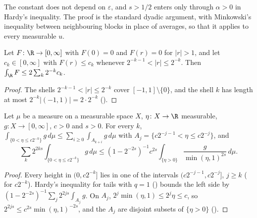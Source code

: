 The constant does not depend on $\varepsilon$, and $s > 1/2$ enters only through $\alpha > 0$ in
Hardy's inequality. The proof is the standard dyadic argument, with Minkowski's inequality
between neighbouring blocks in place of averages, so that it applies to every measurable $u$.

\begin{lemma}
\label{lem:dyadic-shells-line}
\leanok
{}
Let $F \colon \R \to [0, \infty]$ with $F(0) = 0$ and $F(r) = 0$ for $|r| > 1$, and let
$c_k \in [0, \infty]$ with $F(r) \leq c_k$ whenever $2^{-k-1} < |r| \leq 2^{-k}$. Then
$\int_\R F \leq 2 \sum_k 2^{-k} c_k$.
\end{lemma}

\begin{proof}
\leanok
The shells $2^{-k-1} < |r| \leq 2^{-k}$ cover $[-1, 1] \setminus \{0\}$, and the shell $k$ has
length at most $2^{-k} |(-1, 1)| = 2 \cdot 2^{-k}$ ().
\end{proof}

\begin{lemma}
\label{lem:height-layers}
\leanok
{}
Let $\mu$ be a measure on a measurable space $X$, $\eta \colon X \to \R$ measurable,
$g \colon X \to [0, \infty]$, $c > 0$ and $s > 0$. For every $k$,
$\int_{\{0 < \eta \leq c 2^{-k}\}} g \, d\mu \leq \sum_{i \geq 0} \int_{A_{k+i}} g \, d\mu$ with
$A_j = \{c 2^{-j-1} < \eta \leq c 2^{-j}\}$, and
\[
  \sum_k 2^{2ks} \int_{\{0 < \eta \leq c 2^{-k}\}} g \, d\mu
  \leq (1 - 2^{-2s})^{-1} c^{2s} \int_{\{\eta > 0\}} \frac{g}{\min(\eta, 1)^{2s}} \, d\mu .
\]
\end{lemma}

\begin{proof}
\leanok
{}
Every height in $(0, c 2^{-k}]$ lies in one of the intervals $(c 2^{-j-1}, c 2^{-j}]$, $j \geq k$
( for $c 2^{-k}$). Hardy's inequality for tails with $q = 1$
() bounds the left side by $(1 - 2^{-2s})^{-1} \sum_j 2^{2js} \int_{A_j} g$. On
$A_j$, $2^j \min(\eta, 1) \leq 2^j \eta \leq c$, so $2^{2js} \leq c^{2s} \min(\eta, 1)^{-2s}$, and
the $A_j$ are disjoint subsets of $\{\eta > 0\}$ ().
\end{proof}

